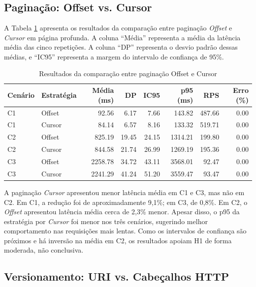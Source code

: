 \documentclass[journal]{IEEEtran}
\begin{document}
\subsection{Paginação: Offset vs. Cursor}

A Tabela \ref{tab:resultados_paginacao} apresenta os resultados da comparação entre paginação \textit{Offset} e \textit{Cursor} em página profunda. A coluna ``Média'' representa a média da latência média das cinco repetições. A coluna ``DP'' representa o desvio padrão dessas médias, e ``IC95'' representa a margem do intervalo de confiança de 95\%.

\begin{table}[htbp]
\caption{Resultados da comparação entre paginação Offset e Cursor}
\label{tab:resultados_paginacao}
\centering
\renewcommand{\arraystretch}{1.2}
\begin{tabularx}{\textwidth}{l l r r r r r r}
\toprule
\textbf{Cenário} & \textbf{Estratégia} & \textbf{Média (ms)} & \textbf{DP} & \textbf{IC95} & \textbf{p95 (ms)} & \textbf{RPS} & \textbf{Erro (\%)} \\
\midrule
C1 & Offset & 92.56 & 6.17 & 7.66 & 143.82 & 487.66 & 0.00 \\
C1 & Cursor & 84.14 & 6.57 & 8.16 & 133.32 & 519.71 & 0.00 \\
C2 & Offset & 825.19 & 19.45 & 24.15 & 1314.21 & 199.80 & 0.00 \\
C2 & Cursor & 844.58 & 21.74 & 26.99 & 1269.19 & 195.36 & 0.00 \\
C3 & Offset & 2258.78 & 34.72 & 43.11 & 3568.01 & 92.47 & 0.00 \\
C3 & Cursor & 2241.29 & 41.24 & 51.20 & 3559.47 & 93.47 & 0.00 \\
\bottomrule
\end{tabularx}
\end{table}

A paginação \textit{Cursor} apresentou menor latência média em C1 e C3, mas não em C2. Em C1, a redução foi de aproximadamente 9,1\%; em C3, de 0,8\%. Em C2, o \textit{Offset} apresentou latência média cerca de 2,3\% menor. Apesar disso, o p95 da estratégia por \textit{Cursor} foi menor nos três cenários, sugerindo melhor comportamento nas requisições mais lentas. Como os intervalos de confiança são próximos e há inversão na média em C2, os resultados apoiam H1 de forma moderada, não conclusiva.

\subsection{Versionamento: URI vs. Cabeçalhos HTTP}
\end{document}
